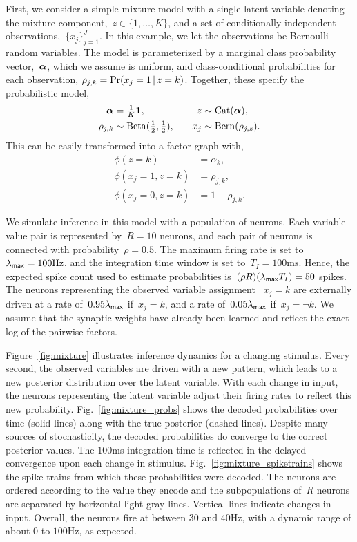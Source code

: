 First, we consider a simple mixture model with a single
latent variable denoting the mixture component,~$z \in \{1, \ldots, K\}$,
and a set of conditionally independent observations,~$\{x_j\}_{j=1}^J$.
In this example, we let the observations be Bernoulli
random variables. The model is parameterized by a marginal
class probability vector,~$\boldsymbol{\alpha}$, which we assume is uniform,
and class-conditional probabilities for each observation,
${\rho_{j,k} = \Pr(x_j=1 \,|\, z=k)}$. Together, these
specify the probabilistic model,
\begin{align*}
  \boldsymbol{\alpha} &= \tfrac{1}{K} \boldsymbol{1}, & & &
    z &\sim \mathrm{Cat}(\boldsymbol{\alpha}), \\
  \rho_{j,k} &\sim \mathrm{Beta}(\tfrac{1}{2},\tfrac{1}{2}),  & & &
  x_j &\sim \mathrm{Bern}(\rho_{j,z}).  
\end{align*}
This can be easily transformed into a factor graph with,
\begin{align*}
  \phi(z=k) &= \alpha_k, \\
  \phi(x_j=1, z=k) &= \rho_{j,k}, \\
  \phi(x_j=0, z=k) &= 1-\rho_{j,k}.
\end{align*}

We simulate inference in this model with a population of neurons.
Each variable-value pair is represented by~$R=10$ neurons, and each
pair of neurons is connected with probability~$\rho=0.5$. The maximum
firing rate is set to~$\lambda_{\mathsf{max}}=100\text{Hz}$, and the integration
time window is set to~$T_I=100\text{ms}$. Hence, the expected spike
count used to estimate probabilities is~$(\rho R)(\lambda_{\mathsf{max}} T_I)
= 50$ spikes. The neurons representing the observed variable assignment
~$x_j=k$ are externally driven at a rate of~$0.95 \lambda_{\mathsf{max}}$ if~$x_j=k$,
and a rate of~$0.05 \lambda_{\mathsf{max}}$ if~$x_j=\neg k$. We assume that the
synaptic weights have already been learned and reflect the exact
log of the pairwise factors. 

Figure~\ref{fig:mixture} illustrates inference dynamics for a
changing stimulus. Every second, the observed variables are driven with
a new pattern, which leads to a new posterior distribution over the
latent variable. With each change in input, the neurons representing the
latent variable adjust their firing rates to reflect this new probability.
Fig.~\ref{fig:mixture_probs} shows the decoded probabilities over time
(solid lines) along with the true posterior (dashed lines). Despite many
sources of stochasticity, the decoded probabilities do converge to
the correct posterior values. The $100$ms integration time is reflected in
the delayed convergence upon each change in stimulus.
Fig.~\ref{fig:mixture_spiketrains} shows the spike trains from which these
probabilities were decoded. The neurons are ordered according to
the value they encode and the subpopulations of~$R$ neurons are
separated by horizontal light gray lines. Vertical lines indicate changes
in input. Overall, the neurons fire at between $30$ and $40$Hz, with a
dynamic range of about $0$ to $100$Hz, as expected.



